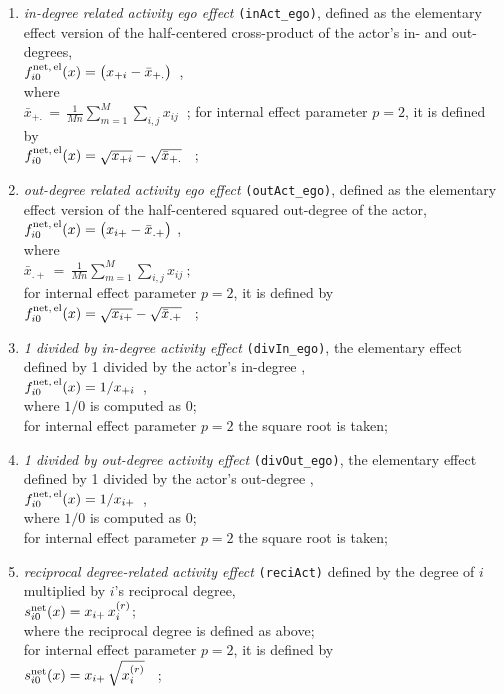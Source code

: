 \documentclass[a4paper,fleqn,11pt]{article}
\newcommand{\+}{\, + \,}
\newcommand{\vit}{\theenumi}
\begin{document}
\begin{enumerate}
 \item {\em in-degree related activity ego effect} \texttt{(inAct\_ego)},
 	 defined as the elementary effect version of the  half-centered  cross-product
 of the actor's in- and out-degrees,\\
 $ f^{\rm net,\, el}_{i\vit}(x) = \big(  x_{+i} - \bar x_{+.}\big)$\ ,\\
 where\\
 $ \bar x_{+.} \,=\,  \frac{1}{Mn} \sum_{m=1}^M \sum_{i,j} x_{ij} \ $ ;
 for internal effect parameter $p=2$, it is defined by\\
 $f^{\rm net,\, el}_{i\vit}(x)  =   \sqrt{   x_{+i}} - \sqrt{\bar x_{+.}} $ \ ; \\

 \item {\em out-degree related activity ego effect} \texttt{(outAct\_ego)},
 	 defined as the elementary effect version of the half-centered
 squared out-degree of the actor,\\
 $ f^{\rm net,\, el}_{i\vit}(x)  =  \big(  x_{i+} - \bar x_{.+}\big)$ ,\\
 where\\
 $ \bar x_{.+} \,=\,  \frac{1}{Mn} \sum_{m=1}^M \sum_{i,j} x_{ij} \ ;  $ \\
 for internal effect parameter $p=2$, it is defined by\\
 $f^{\rm net,\, el}_{i\vit}(x)  =   \sqrt{  x_{i+}} -  \sqrt{\bar x_{.+}} $ \ ; \\

 \item {\em 1 divided by in-degree activity effect} \texttt{(divIn\_ego)},
 the elementary effect defined by 1 divided by the actor's in-degree ,\\
 $ f^{\rm net,\, el}_{i\vit}(x)  =  1/ x_{+i}\,$ ,\\
 where $1/0$ is computed as 0;\\
  for internal effect parameter $p=2$ the square root is taken;

 \item {\em 1 divided by out-degree activity effect} \texttt{(divOut\_ego)},
 the elementary effect defined by 1 divided by the actor's out-degree ,\\
 $ f^{\rm net,\, el}_{i\vit}(x)  =  1/ x_{i+}\,$ ,\\
 where $1/0$ is computed as 0;\\
 for internal effect parameter $p=2$ the square root is taken;

 \item {\em reciprocal degree-related activity effect} \texttt{(reciAct)}
 defined by the degree of $i$ multiplied by $i$'s reciprocal degree,\\
 $s^{\rm net}_{i\vit}(x) =   x_{i+}\, x^{(r)}_{i} $; \\
 where the reciprocal degree is defined as above;\\
 for internal effect parameter $p=2$, it is defined by\\
 $s^{\rm net}_{i\vit}(x) =   x_{i+}\, \sqrt{x^{(r)}_{i}} $ \ ; \\


\end{enumerate}
\end{document}
